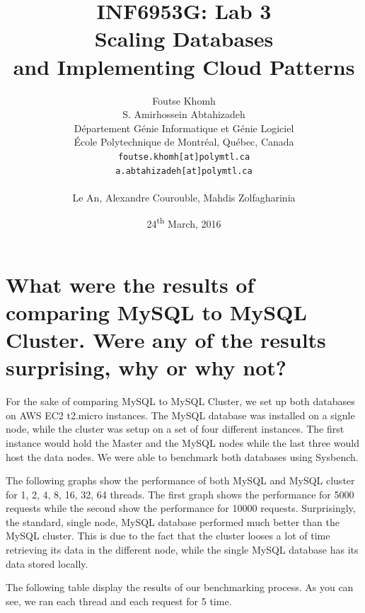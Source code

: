 \documentclass{article}
\title{INF6953G: Lab 3 \\Scaling Databases \\and Implementing Cloud Patterns}
\author{
    Foutse Khomh \\
    S. Amirhossein Abtahizadeh \\
    D\'{e}partement G\'{e}nie Informatique et G\'{e}nie Logiciel \\
    \'{E}cole Polytechnique de Montr\'{e}al, Qu\'{e}bec, Canada \\
    \texttt{foutse.khomh[at]polymtl.ca} \\
    \texttt{a.abtahizadeh[at]polymtl.ca}\\
    {} \\
    Le An, Alexandre Courouble, Mahdis Zolfagharinia
}
\date{24\textsuperscript{th} March, 2016}
\begin{document}
\maketitle



\section{What were the results of comparing MySQL to MySQL Cluster. Were any of the results surprising, why or why not?}\label{Q1}

For the sake of comparing MySQL to MySQL Cluster, we set up both databases on AWS EC2 t2.micro instances. The MySQL database was installed on a signle node, while the cluster was setup on a set of four different instances. The first instance would hold the Master and the MySQL nodes while the last three would host the data nodes. We were able to benchmark both databases using Sysbench.

 The following graphs show the performance of both MySQL and MySQL cluster for 1, 2, 4, 8, 16, 32, 64 threads. The first graph shows the performance for 5000 requests while the second show the performance for 10000 requests. Surprisingly, the standard, single node, MySQL database performed much better than the MySQL cluster. This is due to the fact that the cluster looses a lot of time retrieving its data in the different node, while the single MySQL database has its data stored locally. 
 
 
 

The following table display the results of our benchmarking process. As you can see, we ran each thread and each request for 5 time. 
\end{document}
